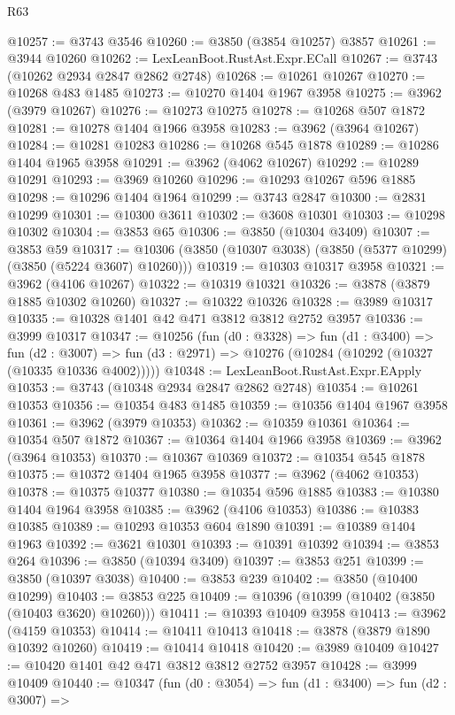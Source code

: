 \begin{lexlean}{R63}
\begin{coremodule}
@10257 := @3743 @3546
@10260 := @3850 (@3854 @10257) @3857
@10261 := @3944 @10260
@10262 := LexLeanBoot.RustAst.Expr.ECall
@10267 := @3743 (@10262 @2934 @2847 @2862 @2748)
@10268 := @10261 @10267
@10270 := @10268 @483 @1485
@10273 := @10270 @1404 @1967 @3958
@10275 := @3962 (@3979 @10267)
@10276 := @10273 @10275
@10278 := @10268 @507 @1872
@10281 := @10278 @1404 @1966 @3958
@10283 := @3962 (@3964 @10267)
@10284 := @10281 @10283
@10286 := @10268 @545 @1878
@10289 := @10286 @1404 @1965 @3958
@10291 := @3962 (@4062 @10267)
@10292 := @10289 @10291
@10293 := @3969 @10260
@10296 := @10293 @10267 @596 @1885
@10298 := @10296 @1404 @1964
@10299 := @3743 @2847
@10300 := @2831 @10299
@10301 := @10300 @3611
@10302 := @3608 @10301
@10303 := @10298 @10302
@10304 := @3853 @65
@10306 := @3850 (@10304 @3409)
@10307 := @3853 @59
@10317 := @10306 (@3850 (@10307 @3038) (@3850 (@5377 @10299) (@3850 (@5224 @3607) @10260)))
@10319 := @10303 @10317 @3958
@10321 := @3962 (@4106 @10267)
@10322 := @10319 @10321
@10326 := @3878 (@3879 @1885 @10302 @10260)
@10327 := @10322 @10326
@10328 := @3989 @10317
@10335 := @10328 @1401 @42 @471 @3812 @3812 @2752 @3957
@10336 := @3999 @10317
@10347 := @10256
    (fun (d0 : @3328) =>
    fun (d1 : @3400) =>
    fun (d2 : @3007) => fun (d3 : @2971) => @10276 (@10284 (@10292 (@10327 (@10335 @10336 @4002)))))
@10348 := LexLeanBoot.RustAst.Expr.EApply
@10353 := @3743 (@10348 @2934 @2847 @2862 @2748)
@10354 := @10261 @10353
@10356 := @10354 @483 @1485
@10359 := @10356 @1404 @1967 @3958
@10361 := @3962 (@3979 @10353)
@10362 := @10359 @10361
@10364 := @10354 @507 @1872
@10367 := @10364 @1404 @1966 @3958
@10369 := @3962 (@3964 @10353)
@10370 := @10367 @10369
@10372 := @10354 @545 @1878
@10375 := @10372 @1404 @1965 @3958
@10377 := @3962 (@4062 @10353)
@10378 := @10375 @10377
@10380 := @10354 @596 @1885
@10383 := @10380 @1404 @1964 @3958
@10385 := @3962 (@4106 @10353)
@10386 := @10383 @10385
@10389 := @10293 @10353 @604 @1890
@10391 := @10389 @1404 @1963
@10392 := @3621 @10301
@10393 := @10391 @10392
@10394 := @3853 @264
@10396 := @3850 (@10394 @3409)
@10397 := @3853 @251
@10399 := @3850 (@10397 @3038)
@10400 := @3853 @239
@10402 := @3850 (@10400 @10299)
@10403 := @3853 @225
@10409 := @10396 (@10399 (@10402 (@3850 (@10403 @3620) @10260)))
@10411 := @10393 @10409 @3958
@10413 := @3962 (@4159 @10353)
@10414 := @10411 @10413
@10418 := @3878 (@3879 @1890 @10392 @10260)
@10419 := @10414 @10418
@10420 := @3989 @10409
@10427 := @10420 @1401 @42 @471 @3812 @3812 @2752 @3957
@10428 := @3999 @10409
@10440 := @10347
    (fun (d0 : @3054) =>
    fun (d1 : @3400) =>
    fun (d2 : @3007) =>

\end{coremodule}
\end{lexlean}
